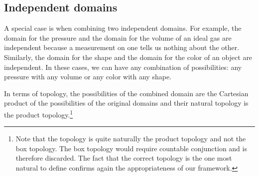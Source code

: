 \documentclass[11pt,letterpaper,fleqn]{memoir} %
\begin{document}
\subsection{Independent domains}

A special case is when combining two independent domains. For example, the domain for the pressure and the domain for the volume of an ideal gas are independent because a measurement on one tells us nothing about the other. Similarly, the domain for the shape and the domain for the color of an object are independent. In these cases, we can have any combination of possibilities: any pressure with any volume or any color with any shape.

In terms of topology, the possibilities of the combined domain are the Cartesian product of the possibilities of the original domains and their natural topology is the product topology.\footnote{Note that the topology is quite naturally the product topology and not the box topology. The box topology would require countable conjunction and is therefore discarded. The fact that the correct topology is the one most natural to define confirms again the appropriateness of our framework.}
\end{document}
